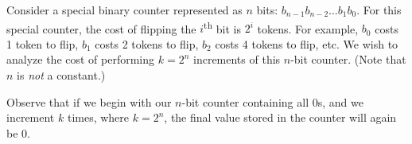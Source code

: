 
\clearpage
{}

Consider a special binary counter represented as $n$ bits: $b_{n-1}
b_{n-2} \ldots b_1 b_0$. For this special counter, the cost of
flipping the $i$\textsuperscript{th} bit is $2^i$ tokens. For example, $b_0$
costs 1 token to flip, $b_1$ costs 2 tokens to flip, $b_2$ costs 4
tokens to flip, etc.  We wish to analyze the cost of performing $k =
2^n$ increments of this $n$-bit counter. (Note that $n$ is \emph{not}
a constant.)

Observe that if we begin with our $n$-bit counter containing all 0s,
and we increment $k$ times, where $k = 2^n$, the final value stored in
the counter will again be 0.

